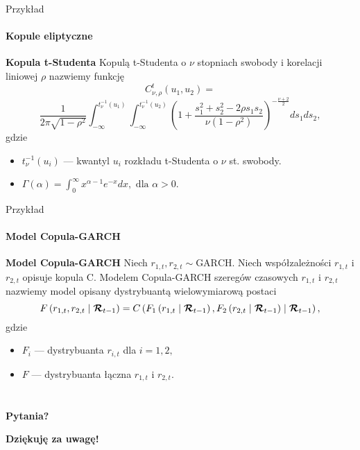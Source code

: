 \documentclass[a4paper, 11pt]{beamer}
\begin{document}
	\begin{frame}{Przykład}
		\framesubtitle{Kopule eliptyczne}
		
		\begin{block}{\textbf{Kopula t-Studenta}}
			Kopulą t-Studenta o $\nu$ stopniach swobody i korelacji liniowej $\rho$ nazwiemy funkcję \[
				C_{\nu,\rho}^{t}\left(u_{1},u_{2}\right) =\]\[
					\frac{1}{2\pi\sqrt{1-\rho^{2}}} \int_{-\infty}^{t_{\nu}^{-1}\left(u_{1}\right)}\int_{-\infty}^{t_{\nu}^{-1}\left(u_{2}\right)}
						\left(1+\frac{s_{1}^{2}+s_{2}^{2}-2\rho s_{1}s_{2}}{\nu\left(1-\rho^{2}\right)}\right)^{-\frac{\nu+2}{2}}
					ds_{1}ds_{2},
			\] gdzie
			\begin{itemize}
				\item $t_{\nu}^{-1}\left(u_{i}\right)$ --- kwantyl $u_i$ rozkładu t-Studenta o $\nu$ st. swobody.
				\item $\Gamma\left(\alpha\right)=\int_{0}^{\infty}x^{\alpha-1}e^{-x}dx,\mbox{ dla }\alpha>0.$
			\end{itemize}
		\end{block}
	\end{frame}
	
	\begin{frame}{Przykład}
		\framesubtitle{Model Copula-GARCH}
		
		\begin{block}{\textbf{Model Copula-GARCH}}
			Niech $r_{1,t}, r_{2,t} \sim \mbox{GARCH}.$ Niech współzależności $r_{1,t}$ i $r_{2,t}$
			opisuje kopula C. Modelem Copula-GARCH szeregów czasowych $r_{1,t}$ i $r_{2,t}$ nazwiemy
			model opisany dystrybuantą wielowymiarową postaci \[
				F\left(r_{1,t}, r_{2,t}\mid \boldsymbol{{\cal R}}_{t-1}\right) = C\left(
					F_1\left(r_{1,t}\mid \boldsymbol{{\cal R}}_{t-1}\right),
					F_2\left(r_{2,t}\mid \boldsymbol{{\cal R}}_{t-1}\right)
					\mid
					\boldsymbol{{\cal R}}_{t-1}
				\right),
			\] gdzie
			\begin{itemize}
				\item $F_i$ --- dystrybuanta $r_{i,t}$ dla $i=1,2,$
				\item $F$ --- dystrybuanta łączna $r_{1,t}$ i $r_{2,t}.$
			\end{itemize}
		\end{block}
		
	\end{frame}

	\section*{}

	\begin{frame}
		\center
		\Huge \bfseries
		Pytania?
	\end{frame}

	\begin{frame}
		\center
		\Huge \bfseries
		Dziękuję za uwagę!
	\end{frame}
\end{document}
